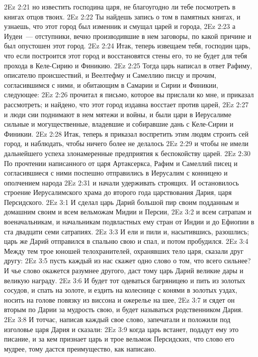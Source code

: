 \vs 2Ez 2:21 но известить господина царя, не благоугодно ли тебе посмотреть в книгах отцов твоих.
\vs 2Ez 2:22 Ты найдешь запись о том в памятных книгах, и узнаешь, что этот город был изменник и смущал царей и города,
\vs 2Ez 2:23 а Иудеи~--- отступники, вечно производившие в нем заговоры, по какой причине и был опустошен этот город.
\vs 2Ez 2:24 Итак, теперь извещаем тебя, господин царь, что если построится этот город и восстановятся стены его, то не будет для тебя прохода в Келе-Сирию и Финикию.
\rsbpar\vs 2Ez 2:25 Тогда царь написал в ответ Рафиму, описателю происшествий, и Веелтефму и Самеллию писцу и прочим, согласившимся с ними, и обитающим в Самарии и Сирии и Финикии, следующее:
\vs 2Ez 2:26 прочитал я письмо, которое вы прислали ко мне, и приказал рассмотреть; и найдено, что этот город издавна восстает против царей,
\vs 2Ez 2:27 и люди сии поднимают в нем мятежи и войны, и были цари в Иерусалиме сильные и могущественные, владевшие и собиравшие дань с Келе-Сирии и Финикии.
\vs 2Ez 2:28 Итак, теперь я приказал воспретить этим людям строить сей город, и наблюдать, чтобы ничего более не делалось
\vs 2Ez 2:29 и чтобы не имели дальнейшего успеха злонамеренные предприятия к беспокойству царей.
\vs 2Ez 2:30 По прочтении написанного от царя Артаксеркса, Рафим и Самеллий писец и согласившиеся с ними поспешно отправились в Иерусалим с конницею и ополчением народа
\vs 2Ez 2:31 и начали удерживать строящих. И остановилось строение Иерусалимского храма до второго года царствования Дария, царя Персидского.
\vs 2Ez 3:1 И сделал царь Дарий большой пир своим подданным и домашним своим и всем вельможам Мидии и Персии,
\vs 2Ez 3:2 и всем сатрапам и военачальникам, и начальникам подвластных ему стран от Индии и до Ефиопии в ста двадцати семи сатрапиях.
\vs 2Ez 3:3 И ели и пили и, насытившись, разошлись; царь же Дарий отправился в спальню свою и спал, и потом пробудился.
\rsbpar\vs 2Ez 3:4 Между тем трое юношей телохранителей, охранявших тело царя, сказали друг другу:
\vs 2Ez 3:5 пусть каждый из нас скажет одно слово о том, что всего сильнее? И чье слово окажется разумнее другого, даст тому царь Дарий великие дары и великую награду.
\vs 2Ez 3:6 И будет тот одеваться багряницею и пить из золотых сосудов, и спать на золоте, и ездить на колеснице с конями в золотых уздах, носить на голове повязку из виссона и ожерелье на шее,
\vs 2Ez 3:7 и сядет он вторым по Дарии за мудрость свою, и будет называться родственником Дария.
\vs 2Ez 3:8 И тотчас, написав каждый свое слово, запечатали и положили под изголовье царя Дария и сказали:
\vs 2Ez 3:9 когда царь встанет, подадут ему это писание, и за кем признает царь и трое вельмож Персидских, что слово его мудрее, тому дастся преимущество, как написано.
